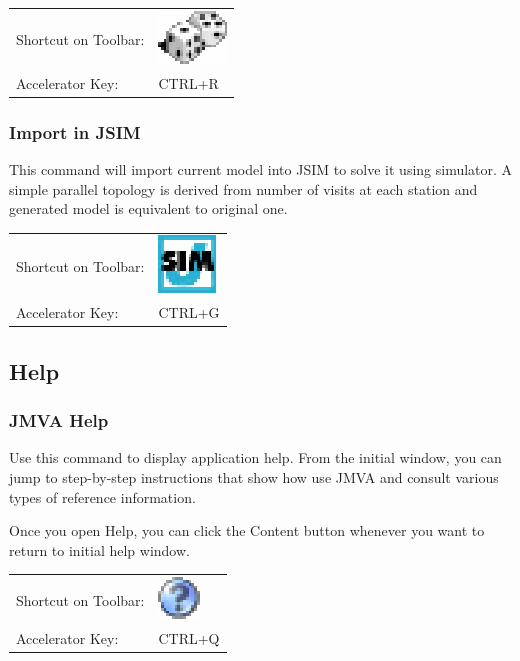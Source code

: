 \noindent
\begin{tabular}{ll}
Shortcut on Toolbar: & \includegraphics[scale=.8]{img/jmva/randomize}\\
Accelerator Key: & CTRL+R
\end{tabular}

\subsubsection{Import in JSIM}
This command will import current model into JSIM to solve it using
simulator. A simple parallel topology is derived from number of
visits at each station and generated model is equivalent to original
one.

\noindent
\begin{tabular}{ll}
Shortcut on Toolbar: & \includegraphics[scale=.8]{img/jmva/toJSIM}\\
Accelerator Key: & CTRL+G
\end{tabular}

\subsection{Help}
\subsubsection{JMVA Help}
Use this command to display application help. From the initial
window, you can jump to step-by-step instructions that show how use
JMVA and consult various types of reference information.

Once you open Help, you can click the Content button whenever you
want to return to initial help window.

\noindent
\begin{tabular}{ll}
Shortcut on Toolbar: & \includegraphics[scale=.8]{img/jmva/help}\\
Accelerator Key: & CTRL+Q
\end{tabular}

